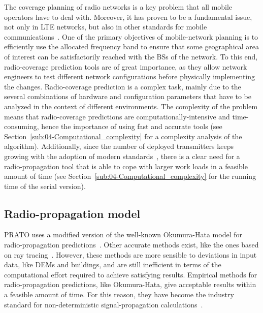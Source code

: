 The coverage planning of radio networks is a key problem that all
mobile operators have to deal with. Moreover, it has proven to be
a fundamental issue, not only in LTE networks, but also in other standards
for mobile communications~\cite{Saleh_On_the_coveraga_extension_in_LTE_networks:2010,Shabbir_Comparison_of_radio_propagation_models:2011,Siomina:Minimum.pilot.power.for.service.coverage,Valcarce_Applying.FDTD.to.the.coverage.prediction.of.WiMAX:2009}.
One of the primary objectives of mobile-network planning is to efficiently
use the allocated frequency band to ensure that some geographical
area of interest can be satisfactorily reached with the BSs of the
network. To this end, radio-coverage prediction tools are of great
importance, as they allow network engineers to test different network
configurations before physically implementing the changes. Radio-coverage
prediction is a complex task, mainly due to the several combinations
of hardware and configuration parameters that have to be analyzed
in the context of different environments. The complexity of the problem
means that radio-coverage predictions are computationally-intensive
and time-consuming, hence the importance of using fast and accurate
tools (see Section~\ref{sub:04-Computational_complexity} for a complexity
analysis of the algorithm). Additionally, since the number of deployed
transmitters keeps growing with the adoption of modern standards~\cite{Saleh_On_the_coveraga_extension_in_LTE_networks:2010},
there is a clear need for a radio-propagation tool that is able to
cope with larger work loads in a feasible amount of time (see Section~\ref{sub:04-Computational_complexity}
for the running time of the serial version).


\subsection{Radio-propagation model \label{sub:04-Radio_propagation_model}}

PRATO uses a modified version of the well-known Okumura-Hata model
for radio-propagation predictions~\cite{Hata_Empirical_formula_for_propagation_loss_in_land_mobile_radio_services:1980}.
Other accurate methods exist, like the ones based on ray tracing~\cite{Corre_Three_dimensional_urban_EM_wave_propagation_model_for_radio_network_planning_and_optimization_over_large_areas:2009,Vilhar-Efficient_open_source_ray_tracing_methods_for_rural_environment:efficient}.
However, these methods are more sensible to deviations in input data,
like DEMs and buildings, and are still inefficient in terms of the
computational effort required to achieve satisfying results. Empirical
methods for radio-propagation predictions, like Okumura-Hata, give
acceptable results within a feasible amount of time. For this reason,
they have become the industry standard for non-deterministic signal-propagation
calculations~\cite{Begovic_Applicability_evaluation_of_Okumura_Ericsson_and_Winner_propagation_models_for_coverage_planning:2012,Cichon_Propagation.prediction.models:1995,Hata-Empirical_formula_for_propagation_loss_in_land_mobile_radio_services:1980,Shabbir_Comparison_of_radio_propagation_models:2011,Song_Evolved_cellular_network_planning_and_optimization_for_UMTS_and_LTE:2010}.

